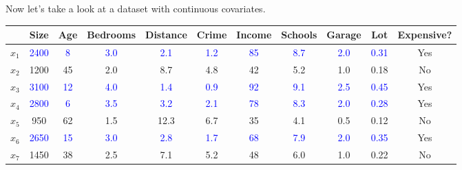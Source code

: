   \begin{example}
    Now let's take a look at a dataset with continuous covariates. 

    \begin{table}[H]
      \centering
      {\footnotesize 
      \begin{tabular}{|c|c|c|c|c|c|c|c|c|c|c|}
        \hline
        & Size & Age & Bedrooms & Distance & Crime & Income & Schools & Garage & Lot & Expensive? \\
        \hline
        $x_1$ & \textcolor{blue}{2400} & \textcolor{blue}{8} & \textcolor{blue}{3.0} & \textcolor{blue}{2.1} & \textcolor{blue}{1.2} & \textcolor{blue}{85} & \textcolor{blue}{8.7} & \textcolor{blue}{2.0} & \textcolor{blue}{0.31} & Yes \\
        \hline
        $x_2$ & \textcolor{green!50!black}{1200} & \textcolor{green!50!black}{45} & \textcolor{green!50!black}{2.0} & \textcolor{green!50!black}{8.7} & \textcolor{green!50!black}{4.8} & \textcolor{green!50!black}{42} & \textcolor{green!50!black}{5.2} & \textcolor{green!50!black}{1.0} & \textcolor{green!50!black}{0.18} & No \\
        \hline
        $x_3$ & \textcolor{blue}{3100} & \textcolor{blue}{12} & \textcolor{blue}{4.0} & \textcolor{blue}{1.4} & \textcolor{blue}{0.9} & \textcolor{blue}{92} & \textcolor{blue}{9.1} & \textcolor{blue}{2.5} & \textcolor{blue}{0.45} & Yes \\
        \hline
        $x_4$ & \textcolor{blue}{2800} & \textcolor{blue}{6} & \textcolor{blue}{3.5} & \textcolor{blue}{3.2} & \textcolor{blue}{2.1} & \textcolor{blue}{78} & \textcolor{blue}{8.3} & \textcolor{blue}{2.0} & \textcolor{blue}{0.28} & Yes \\
        \hline
        $x_5$ & \textcolor{green!50!black}{950} & \textcolor{green!50!black}{62} & \textcolor{green!50!black}{1.5} & \textcolor{green!50!black}{12.3} & \textcolor{green!50!black}{6.7} & \textcolor{green!50!black}{35} & \textcolor{green!50!black}{4.1} & \textcolor{green!50!black}{0.5} & \textcolor{green!50!black}{0.12} & No \\
        \hline
        $x_6$ & \textcolor{blue}{2650} & \textcolor{blue}{15} & \textcolor{blue}{3.0} & \textcolor{blue}{2.8} & \textcolor{blue}{1.7} & \textcolor{blue}{68} & \textcolor{blue}{7.9} & \textcolor{blue}{2.0} & \textcolor{blue}{0.35} & Yes \\
        \hline
        $x_7$ & \textcolor{green!50!black}{1450} & \textcolor{green!50!black}{38} & \textcolor{green!50!black}{2.5} & \textcolor{green!50!black}{7.1} & \textcolor{green!50!black}{5.2} & \textcolor{green!50!black}{48} & \textcolor{green!50!black}{6.0} & \textcolor{green!50!black}{1.0} & \textcolor{green!50!black}{0.22} & No \\

\end{tabular}}
\end{table}
\end{example}
